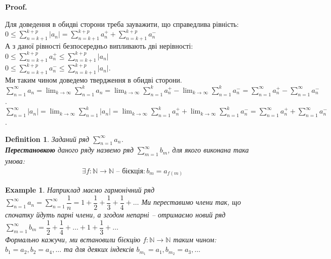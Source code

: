 \documentclass[a4paper, 10pt]{article}
\makeatletter
\theoremstyle{theoremdd}
\theoremstyle{theoremdd}
\theoremstyle{theoremdd}
\newtheorem{definition}[theorem]{Definition}
\theoremstyle{theoremdd}
\theoremstyle{theoremdd}
\newtheorem{example}[theorem]{Example}
\theoremstyle{theoremdd}
\theoremstyle{theoremdd}
\theoremstyle{theoremdd}
\theoremstyle{theoremdd}
\renewenvironment{proof}[1][Proof.\\]{\par
\pushQED{\hfill \qed}%
\normalfont \topsep6\p@\@plus6\p@\relax
\trivlist
\item\relax
{\bfseries
#1\@addpunct{.}}\hspace\labelsep\ignorespaces
}{%
\popQED\endtrivlist\@endpefalse
}
\makeatother
\begin{document}
\begin{proof}
Для доведення в обидві сторони треба зауважити, що справедлива рівність:\\
$0 \leq \displaystyle\sum_{n=k+1}^{k+p} |a_n| = \sum_{n=k+1}^{k+p} a_n^+ + \sum_{n=k+1}^{k+p} a_n^-$\\
А з даної рівності безпосередньо випливають дві нерівності:\\
$0 \leq \displaystyle\sum_{n=k+1}^{k+p} a_n^+ \leq \sum_{n=k+1}^{k+p} |a_n|$\\
$0 \leq \displaystyle\sum_{n=k+1}^{k+p} a_n^- \leq \sum_{n=k+1}^{k+p} |a_n|$.\\
Ми таким чином доведемо твердження в обидві сторони.
\bigskip \\
$\displaystyle\sum_{n=1}^\infty a_n = \lim_{k \to \infty} \sum_{n=1}^k a_n = \lim_{k \to \infty} \sum_{n=1}^k a_n^+ - \lim_{k \to \infty} \sum_{n=1}^k a_n^- = \sum_{n=1}^\infty a_n^+ - \sum_{n=1}^\infty a_n^-$.\\
$\displaystyle\sum_{n=1}^\infty |a_n| = \lim_{k \to \infty} \sum_{n=1}^k |a_n| = \lim_{k \to \infty} \sum_{n=1}^k a_n^+ + \lim_{k \to \infty} \sum_{n=1}^k a_n^- = \sum_{n=1}^\infty a_n^+ + \sum_{n=1}^\infty a_n^-$.
\end{proof}

\begin{definition}
Заданий ряд $\displaystyle\sum_{n=1}^\infty a_n$.\\
\textbf{Перестановкою} даного ряду назвемо ряд $\displaystyle\sum_{m=1}^\infty b_m$, для якого виконана така умова:
\begin{align*}
\exists f \colon \mathbb{N} \to \mathbb{N} \text{ -- бієкція}: b_m = a_{f(m)}
\end{align*}
\end{definition}

\begin{example}
Наприклад маємо гармонічний ряд $\displaystyle \sum_{n=1}^\infty a_n = \sum_{n=1}^\infty \dfrac{1}{n} = 1 + \dfrac{1}{2} + \dfrac{1}{3} + \dfrac{1}{4} + \dots$ Ми переставимо члени так, що спочатку йдуть парні члени, а згодом непарні -- отримаємо новий ряд $\displaystyle\sum_{m=1}^\infty b_m = \dfrac{1}{2} + \dfrac{1}{4} + \dots + 1 + \dfrac{1}{3} + \dots$\\
Формально кажучи, ми встановили бієкцію $f \colon \mathbb{N} \to \mathbb{N}$ таким чином: $b_{1} = a_{2}, b_{2} = a_4,\dots$ та для деяких індексів $b_{m_1} = a_1, b_{m_2} = a_3, \dots$
\end{example}
\end{document}
